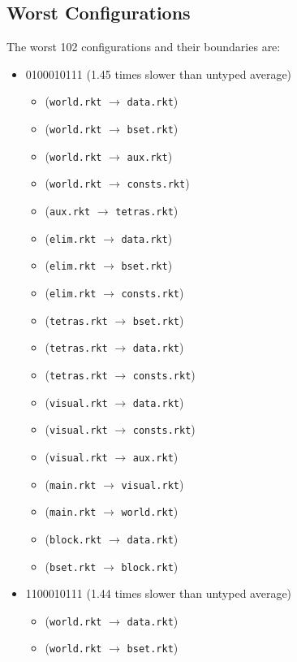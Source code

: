 \documentclass{article}
\newcommand{\mono}[1]{\texttt{#1}}
\begin{document}
\subsection{Worst Configurations}
The worst 102 configurations and their boundaries are:
\begin{itemize}
\item 0100010111 (1.45 times slower than untyped average)
  \begin{itemize}
  \item (\mono{world.rkt} $\rightarrow$ \mono{data.rkt})
  \item (\mono{world.rkt} $\rightarrow$ \mono{bset.rkt})
  \item (\mono{world.rkt} $\rightarrow$ \mono{aux.rkt})
  \item (\mono{world.rkt} $\rightarrow$ \mono{consts.rkt})
  \item (\mono{aux.rkt} $\rightarrow$ \mono{tetras.rkt})
  \item (\mono{elim.rkt} $\rightarrow$ \mono{data.rkt})
  \item (\mono{elim.rkt} $\rightarrow$ \mono{bset.rkt})
  \item (\mono{elim.rkt} $\rightarrow$ \mono{consts.rkt})
  \item (\mono{tetras.rkt} $\rightarrow$ \mono{bset.rkt})
  \item (\mono{tetras.rkt} $\rightarrow$ \mono{data.rkt})
  \item (\mono{tetras.rkt} $\rightarrow$ \mono{consts.rkt})
  \item (\mono{visual.rkt} $\rightarrow$ \mono{data.rkt})
  \item (\mono{visual.rkt} $\rightarrow$ \mono{consts.rkt})
  \item (\mono{visual.rkt} $\rightarrow$ \mono{aux.rkt})
  \item (\mono{main.rkt} $\rightarrow$ \mono{visual.rkt})
  \item (\mono{main.rkt} $\rightarrow$ \mono{world.rkt})
  \item (\mono{block.rkt} $\rightarrow$ \mono{data.rkt})
  \item (\mono{bset.rkt} $\rightarrow$ \mono{block.rkt})
  \end{itemize}
\item 1100010111 (1.44 times slower than untyped average)
  \begin{itemize}
  \item (\mono{world.rkt} $\rightarrow$ \mono{data.rkt})
  \item (\mono{world.rkt} $\rightarrow$ \mono{bset.rkt})

\end{itemize}
\end{itemize}
\end{document}
